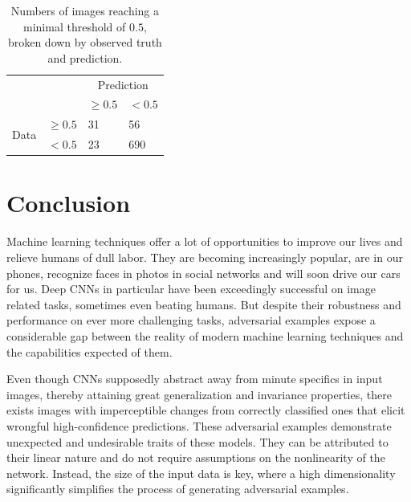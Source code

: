 \documentclass[11pt, a4paper]{article}
\begin{document}
\begin{table}[h!tp]
	\centering
	\begin{tabular}{|ll|ll|}
		\hline
		& & \multicolumn{2}{c|}{Prediction} \\
		& & $\geq 0.5$ & $< 0.5$ \\
		\hline
		\multirow{2}{*}{Data} & $\geq 0.5$ & 31 & 56 \\
		& $< 0.5$ & 23 & 690 \\
		\hline
	\end{tabular}
	\caption[Image counts reaching a threshold as observed and predicted by curve fitting]{Numbers of images reaching a minimal threshold of $0.5$, broken down by observed truth and prediction.}
	\label{tab:prediction-quantities}
\end{table}












\section{Conclusion}
Machine learning techniques offer a lot of opportunities to improve our lives and relieve humans of dull labor. They are becoming increasingly popular, are in our phones, recognize faces in photos in social networks and will soon drive our cars for us. Deep CNNs in particular have been exceedingly successful on image related tasks, sometimes even beating humans. But despite their robustness and performance on ever more challenging tasks, adversarial examples expose a considerable gap between the reality of modern machine learning techniques and the capabilities expected of them.

Even though CNNs supposedly abstract away from minute specifics in input images, thereby attaining great generalization and invariance properties, there exists images with imperceptible changes from correctly classified ones that elicit wrongful high-confidence predictions. These adversarial examples demonstrate unexpected and undesirable traits of these models. They can be attributed to their linear nature and do not require assumptions on the nonlinearity of the network. Instead, the size of the input data is key, where a high dimensionality significantly simplifies the process of generating adversarial examples.
\end{document}
